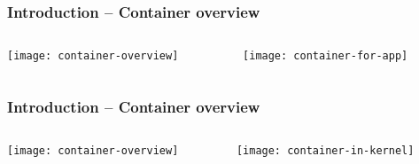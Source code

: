 \begin{frame}[plain]
	\frametitle{Introduction -- Container overview }
	
	
	
	\begin{columns}
		
		\begin{column}{.3\textwidth}
			\centering

			\texttt{[image: container-overview]}
		\end{column}
		
		\begin{column}{.7\textwidth}
			\texttt{[image: container-for-app]}

		\end{column}
		
		
	\end{columns}
	
	
\end{frame}

\begin{frame}[plain]
	\frametitle{Introduction -- Container overview }
	
	
	
	\begin{columns}
		
		\begin{column}{.3\textwidth}
			\centering
			
			\texttt{[image: container-overview]}
		\end{column}
		
		\begin{column}{.7\textwidth}
			\texttt{[image: container-in-kernel]}
			
		\end{column}
		
		
	\end{columns}
	
	
\end{frame}

